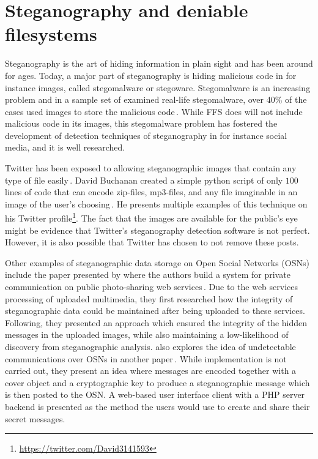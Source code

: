 \section{Steganography and deniable filesystems}
Steganography is the art of hiding information in plain sight and has been around for ages. Today, a major part of steganography is hiding malicious code in for instance images, called stegomalware or stegoware. Stegomalware is an increasing problem and in a sample set of examined real-life stegomalware, over 40\% of the cases used images to store the malicious code\,\cite{stichtingcuingfoundationSIMARGLStegwarePrimer2020}. While FFS does will not include malicious code in its images, this stegomalware problem has fostered the development of detection techniques of steganography in for instance social media, and it is well researched. 

Twitter has been exposed to allowing steganographic images that contain any type of file easily\,\cite{TwitterImagesCan}. David Buchanan created a simple python script of only $100$ lines of code that can encode zip-files, mp3-files, and any file imaginable in an image of the user's choosing\,\cite{buchananTweetablepolyglotpng2022}. He presents multiple examples of this technique on his Twitter profile\footnote{\url{https://twitter.com/David3141593}}. The fact that the images are available for the public's eye might be evidence that Twitter's steganography detection software is not perfect. However, it is also possible that Twitter has chosen to not remove these posts.

Other examples of steganographic data storage on Open Social Networks (OSNs) include the paper presented by \citeauthor{ningSecretMessageSharing2014} where the authors build a system for private communication on public photo-sharing web services\,\cite{ningSecretMessageSharing2014}. Due to the web services processing of uploaded multimedia, they first researched how the integrity of steganographic data could be maintained after being uploaded to these services. Following, they presented an approach which ensured the integrity of the hidden messages in the uploaded images, while also maintaining a low-likelihood of discovery from steganographic analysis. \citeauthor{beatoUndetectableCommunicationOnline2014} also explores the idea of undetectable communications over OSNs in another paper\,\cite{beatoUndetectableCommunicationOnline2014}. While implementation is not carried out, they present an idea where messages are encoded together with a cover object and a cryptographic key to produce a steganographic message which is then posted to the OSN. A web-based user interface client with a PHP server backend is presented as the method the users would use to create and share their secret messages.

